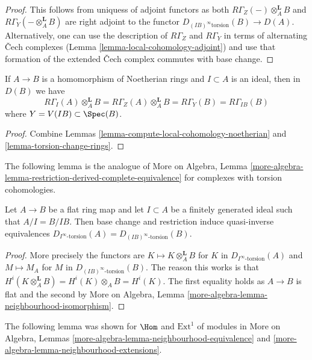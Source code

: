 \begin{proof}
This follows from uniquess of adjoint functors
as both $R\Gamma_Z( - ) \otimes_A^\mathbf{L} B$ and
$R\Gamma_Y(- \otimes_A^\mathbf{L} B)$
are right adjoint to the functor
$D_{(IB)^\infty\text{torsion}}(B) \to D(A)$. Alternatively, one can use
the description of $R\Gamma_Z$ and $R\Gamma_Y$ in terms of alternating
{\v C}ech complexes (Lemma \ref{lemma-local-cohomology-adjoint})
and use that formation of the extended {\v C}ech
complex commutes with base change.
\end{proof}

\begin{lemma}
\label{lemma-local-cohomology-change-rings}
If $A \to B$ is a homomorphism of Noetherian rings and $I \subset A$
is an ideal, then in $D(B)$ we have
$$
R\Gamma_I(A) \otimes_A^\mathbf{L} B =
R\Gamma_Z(A) \otimes_A^\mathbf{L} B =
R\Gamma_Y(B) = R\Gamma_{IB}(B)
$$
where $Y = V(IB) \subset \Spec(B)$.
\end{lemma}

\begin{proof}
Combine Lemmas \ref{lemma-compute-local-cohomology-noetherian} and
\ref{lemma-torsion-change-rings}.
\end{proof}

\noindent
The following lemma is the analogue of
More on Algebra, Lemma
\ref{more-algebra-lemma-restriction-derived-complete-equivalence}
for complexes with torsion cohomologies.

\begin{lemma}
\label{lemma-torsion-flat-change-rings}
Let $A \to B$ be a flat ring map and let $I \subset A$ be a finitely
generated ideal such that $A/I = B/IB$. Then base change and
restriction induce quasi-inverse equivalences
$D_{I^\infty\text{-torsion}}(A) = D_{(IB)^\infty\text{-torsion}}(B)$.
\end{lemma}

\begin{proof}
More precisely the functors are $K \mapsto K \otimes_A^\mathbf{L} B$
for $K$ in $D_{I^\infty\text{-torsion}}(A)$ and $M \mapsto M_A$
for $M$ in $D_{(IB)^\infty\text{-torsion}}(B)$. The reason this works
is that $H^i(K \otimes_A^\mathbf{L} B) = H^i(K) \otimes_A B = H^i(K)$.
The first equality holds as $A \to B$ is flat and the second by
More on Algebra, Lemma \ref{more-algebra-lemma-neighbourhood-isomorphism}.
\end{proof}

\noindent
The following lemma was shown for $\Hom$ and $\text{Ext}^1$ of modules in
More on Algebra, Lemmas \ref{more-algebra-lemma-neighbourhood-equivalence} and
\ref{more-algebra-lemma-neighbourhood-extensions}.

